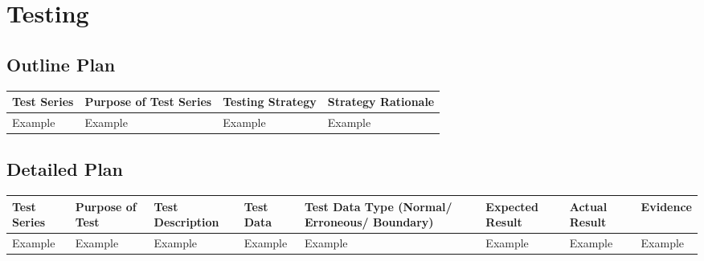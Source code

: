 \section{Testing}

\begin{landscape}
\subsection{Outline Plan}

\begin{center}
    \begin{tabular}{|p{2cm}|p{5cm}|p{5cm}|p{4cm}|}
        \hline
        \textbf{Test Series} & \textbf{Purpose of Test Series} & \textbf{Testing Strategy} & \textbf{Strategy Rationale}\\ \hline
        Example & Example & Example & Example \\ \hline
    \end{tabular}
\end{center}

\subsection{Detailed Plan}

\begin{center}
    \begin{longtable}{|p{1.5cm}|p{2.5cm}|p{2.5cm}|p{2cm}|p{2cm}|p{2cm}|p{2cm}|p{2cm}|}
        \hline
        \textbf{Test Series} & \textbf{Purpose of Test} & \textbf{Test Description} & \textbf{Test Data} & \textbf{Test Data Type (Normal/ Erroneous/ Boundary)} & \textbf{Expected Result} & \textbf{Actual Result} & \textbf{Evidence}\\ \hline
        Example & Example & Example & Example & Example & Example & Example & Example \\ \hline
    \end{longtable}
\end{center}
\end{landscape}